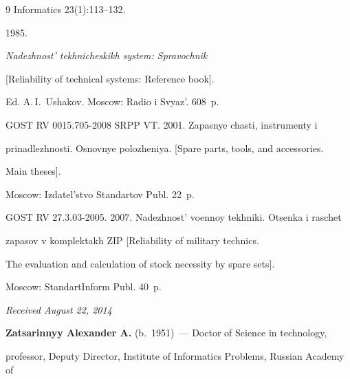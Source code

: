 {{\begin{thebibliography}{9}
{Informatics} 23(1):113--132.


 1985.

\textit{Nadezhnost' tekh\-ni\-che\-skikh system: Spravochnik}

[Reliability of technical systems: Reference book].

Ed. A.\,I.~Ushakov.  Moscow: Radio i Svyaz'. 608~p.


GOST RV 0015.705-2008 SRPP VT. 2001. Zapasnye chasti, instrumenty i

prinadlezhnosti. Osnovnye polozheniya. [Spare parts, tools, and accessories.

Main theses].

Moscow: Izdatel'stvo Standartov Publ. 22~p.


GOST RV 27.3.03-2005. 2007. Nadezhnost' voennoy tekhniki. Otsenka i raschet

zapasov v komplektakh ZIP [Reliability of military technics.

The evaluation and calculation of stock necessity by spare sets].

Moscow: StandartInform Publ. 40~p.

\end{thebibliography}

} }











\hfill{\small\textit{Received August 22, 2014}}








\Contr



\noindent

\textbf{Zatsarinnyy Alexander A.} (b.\ 1951)~--- Doctor of Science in technology,

professor, Deputy Director, Institute of Informatics Problems, Russian Academy of

